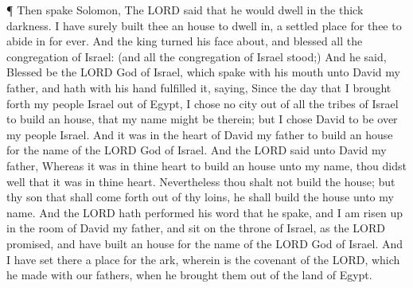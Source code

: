  ¶ Then spake Solomon, The LORD said that he would dwell in
the thick darkness.  I have surely built thee an house to
dwell in, a settled place for thee to abide in for ever. 
And the king turned his face about, and blessed all the congregation of
Israel: (and all the congregation of Israel stood;)  And he
said, Blessed be the LORD God of Israel, which spake with his mouth unto
David my father, and hath with his hand fulfilled it, saying,
 Since the day that I brought forth my people Israel out of
Egypt, I chose no city out of all the tribes of Israel to build an
house, that my name might be therein; but I chose David to be over my
people Israel.  And it was in the heart of David my father
to build an house for the name of the LORD God of Israel. 
And the LORD said unto David my father, Whereas it was in thine heart to
build an house unto my name, thou didst well that it was in thine heart.
 Nevertheless thou shalt not build the house; but thy son
that shall come forth out of thy loins, he shall build the house unto my
name.  And the LORD hath performed his word that he spake,
and I am risen up in the room of David my father, and sit on the throne
of Israel, as the LORD promised, and have built an house for the name of
the LORD God of Israel.  And I have set there a place for
the ark, wherein is the covenant of the LORD, which he made with our
fathers, when he brought them out of the land of Egypt.

